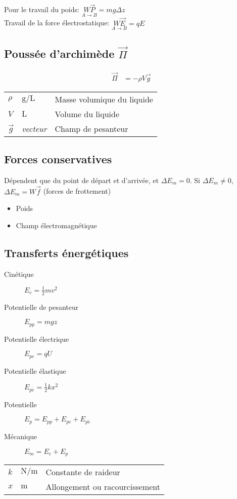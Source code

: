 \documentclass{article}
\newcommand{\deftable}[2]{%
\begin{table}[h]
    \centering
    \begin{tabular}{llp{100mm}}%
        #1
    \end{tabular}
    \label{tab:#2_units}
\end{table}%
}
\newcommand{\deftablevar}[3]{%
    $#1$ & $\si{#2}$ & #3 \\
}
\newcommand{\deftableobj}[3]{%
    $#1$ & \textit{#2} & #3 \\
}
\begin{document}
Pour le travail du poids: $\underset{A\to B}{W\vec P} = mg\Delta z$\\
Travail de la force électrostatique: $\underset{A\to B}{W\vec E} = qE$

\subsection{Poussée d'archimède $\vec \Pi$}
\begin{equation*}
    \begin{split}
        \vec \Pi &= -\rho V \vec g
    \end{split}
\end{equation*}
\deftable{
    \deftablevar{\rho}{\gram\per\liter}{Masse volumique du liquide}
    \deftablevar{V}{\liter}{Volume du liquide}
    \deftableobj{\vec g}{vecteur}{Champ de pesanteur}
}{}

\subsection{Forces conservatives}

Dépendent que du point de départ et d'arrivée, et $\Delta E_m = 0$.
Si $\Delta E_m \not= 0$,  $\Delta E_m = W\vec f$ (forces de frottement)

\begin{itemize}
    \item Poids
    \item Champ électromagnétique
\end{itemize}

\subsection{Transferts énergétiques}

\begin{description}
    \item[Cinétique] $E_c = \frac{1}{2}mv^2$
    \item[Potentielle de pesanteur] $E_{pp} = mgz$
    \item[Potentielle électrique] $E_{pe} = qU$
    \item[Potentielle élastique]  $E_{p\acute e} = \frac{1}{2}kx^2$
    \item[Potentielle]  $E_p = E_{pp} + E_{pe} + E_{p\acute e}$
    \item[Mécanique] $E_m = E_c + E_p$
\end{description}

\deftable{
    \deftablevar{k}{\newton\per\meter}{Constante de raideur}
    \deftablevar{x}{\meter}{Allongement ou racourcissement}
}{}
\end{document}
